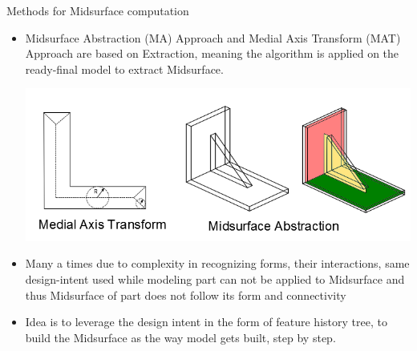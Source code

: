 
\begin{frame}{Methods for Midsurface computation}
\begin{itemize}[noitemsep,label=\textbullet,topsep=2pt,parsep=2pt,partopsep=2pt]
\item Midsurface Abstraction (MA) Approach and Medial Axis Transform (MAT) Approach are based on Extraction, meaning the algorithm is applied on the ready-final model to extract Midsurface. 

\includegraphics[scale=0.25]{../Common/images/MAT_Midsurf.png}

\item Many a times due to complexity in recognizing forms, their interactions, same design-intent used while modeling part can not be applied to Midsurface and thus Midsurface of part does not follow its form and connectivity

\item Idea is to leverage the design intent in the form of feature history tree, to build the Midsurface as the way model gets built, step by step.
\end{itemize}


\end{frame}

